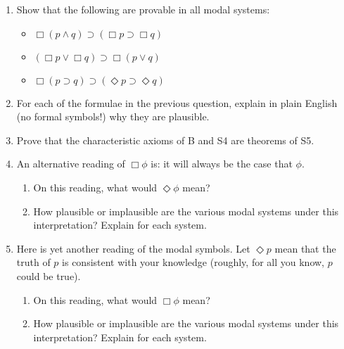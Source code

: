\documentclass[11pt]{scrartcl}
\begin{document}
\begin{enumerate}

 \item Show that the following are provable in all modal systems:

  \begin{itemize}

   \item $\Box(p\wedge q)\supset(\Box p \supset \Box q)$ 

   \item $(\Box p \vee \Box q) \supset \Box(p \vee q)$

   \item $\Box(p \supset q) \supset (\Diamond p \supset \Diamond q)$

  \end{itemize}

 \item For each of the formulae in the previous question, explain in plain
  English (no formal symbols!) why they are plausible.

 \item Prove that the characteristic axioms of B and S4 are theorems of S5.

 \item An alternative reading of $\Box\phi$ is: it will always be the case that
  $\phi$. 
  
  \begin{enumerate} 
   
  \item On this reading, what would $\Diamond\phi$ mean? 

  \item How plausible or implausible are the various modal systems under this
   interpretation? Explain for each system.

 \end{enumerate}

\item Here is yet another reading of the modal symbols. Let $\Diamond p$ mean
 that the truth of $p$ is consistent with your knowledge (roughly, for all you
 know, $p$ could be true). 

 \begin{enumerate}

  \item On this reading, what would $\Box\phi$ mean?

  \item  How plausible or implausible are the various modal systems under this
   interpretation? Explain for each system.

 \end{enumerate}

\end{enumerate}
  
  
  
\end{document}
